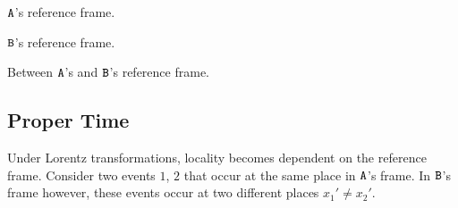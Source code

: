 \documentclass{article}
\begin{document}
\begin{center}
$\texttt{A}$'s reference frame.
\end{center}
\begin{center}
$\texttt{B}$'s reference frame.
\end{center}
\begin{center}
Between $\texttt{A}$'s and $\texttt{B}$'s reference frame.
\end{center}

\subsection{Proper Time}

Under Lorentz transformations, locality becomes dependent on the reference frame. Consider two events $1$, $2$ that occur at the same place in $\texttt{A}$'s frame. In $\texttt{B}$'s frame however, these events occur at two different places $x_1' \neq x_2'$. \\
\end{document}

